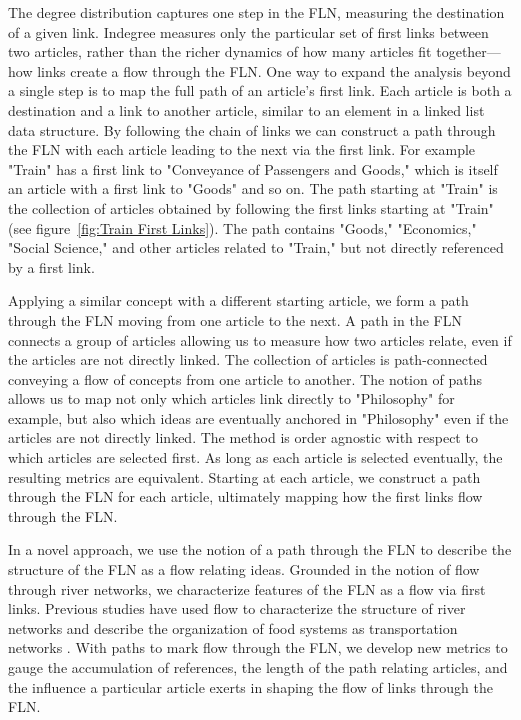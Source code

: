 \documentclass[pre,twocolumn,twoside,superscriptaddress,floatfix, aps, 10pt]{revtex4-1}
\begin{document}
The degree distribution captures one step in the FLN, measuring   
the destination of a given link. 
Indegree measures only the particular set of first links between two articles, 
rather than the richer dynamics of how many articles fit together---how links 
create a flow through the FLN.
One way to expand the analysis beyond a single step is to map the full path of 
an article's first link. 
Each article is both a destination and a link to another article, similar to an element 
in a linked list data structure. 
By following the chain of links we can construct a path through the FLN with each article 
leading to the next via the first link. 
For example "Train" has a first link to "Conveyance of Passengers and Goods," which is itself
an article with a first link to "Goods" and so on. The path starting at "Train" 
is the collection of articles obtained by following the first links starting at "Train"
(see figure~\ref{fig:Train First Links}).
The path contains "Goods," "Economics," "Social Science," and other articles related to 
"Train," but not directly referenced by a first link. 

Applying a similar concept with a 
different starting article, we form 
a path through the FLN moving from one article to the next.
A path in the FLN connects a group of articles allowing us to measure how two articles relate,
even if the articles are not directly linked. 
The collection of articles is path-connected conveying a flow of concepts from one article to another. 
The notion of paths allows us to map not only which articles link directly to "Philosophy" 
for example, but also which ideas are eventually anchored in "Philosophy" even if the articles
are not directly linked.
The method is order agnostic with respect to which articles are selected first. As long as each article is selected eventually, the resulting metrics are equivalent.
Starting at each article, we construct a path through the FLN for each article, 
ultimately mapping how the first links flow through the FLN.

In a novel approach, we use the notion of a path through the FLN to describe 
the structure of the FLN as a flow relating ideas. 
Grounded in the notion of flow through river networks,
\cite{geo_basins}
we characterize features of the FLN as a flow via first links.
Previous studies have used flow to characterize the structure of river networks
\cite{dodds} and describe the organization of food systems as transportation networks
\cite{food_webs}.
With paths to mark flow through the FLN, we develop new metrics to 
gauge the accumulation of references, 
the length of the path relating articles, and the influence a particular
article exerts in shaping the flow of links through the FLN.
\end{document}
